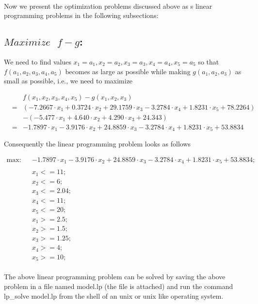 \documentclass[11pt]{article}
\begin{document}
\paragraph{}
Now we present the optimization problems discussed above as s linear programming problems in the following subsections:
\subsection{$Maximize \text{ }f - g$:}
We need to find values $x_1 = a_1,x_2 = a_2,x_3 = a_3,x_4 = a_4,x_5 = a_5$ so that $f(a_1,a_2,a_3,a_4,a_5)$ becomes as large as possible while making $g(a_1,a_2,a_3)$ as small as possible, i.e., we need to maximize
\begin{tiny}
\begin{eqnarray*}
& & f(x_1,x_2,x_3,x_4,x_5) - g(x_1,x_2,x_3)\\
&=& (-7.2667 \cdot x_1 + 0.3724 \cdot x_2 + 29.1759 \cdot x_3 - 3.2784 \cdot x_4 + 1.8231 \cdot x_5 + 78.2264)\\
& & - (-5.477 \cdot x_1 + 4.640 \cdot x_2 + 4.290 \cdot x_3 + 24.343)\\
&=& -1.7897 \cdot x_1 - 3.9176 \cdot x_2 + 24.8859 \cdot x_3 - 3.2784 \cdot x_4 + 1.8231 \cdot x_5 + 53.8834
\end{eqnarray*}
\end{tiny}
Consequently the linear programming problem looks as follows
\begin{tiny}
\begin{eqnarray*}
\text{max:} & & -1.7897 \cdot x_1 - 3.9176 \cdot x_2 + 24.8859 \cdot x_3 - 3.2784 \cdot x_4 + 1.8231 \cdot x_5 + 53.8834;\\
\\
& & x_1 <= 11;\\
& & x_2 <= 6;\\
& & x_3 <= 2.04;\\
& & x_4 <= 11;\\
& & x_5 <= 20;\\
& & x_1 >= 2.5;\\
& & x_2 >= 1.5;\\
& & x_3 >= 1.25;\\
& & x_4 >= 4;\\
& & x_5 >= 10;\\
\end{eqnarray*}
\end{tiny}The above linear programming problem can be solved by saving the above problem in a file named \textsf{model.lp} (the file is attached) and run the command \textsf{lp\_solve model.lp} from the shell of an unix or unix like operating system. 
\end{document}
